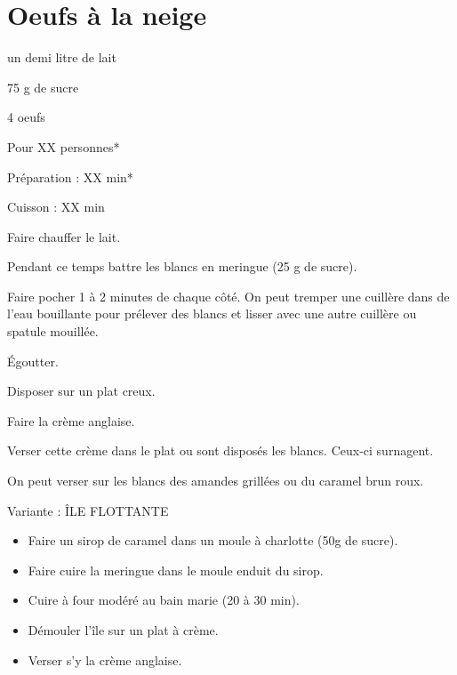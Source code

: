 \section{Oeufs à la neige}

\begin{ingredients}
\item un demi litre de lait
\item 75 g de sucre
\item 4 oeufs
\end{ingredients}
\begin{infos}
\item Pour XX personnes*		%
\item Préparation : XX min*		%
\item Cuisson : XX min			%
\end{infos}
\begin{etapes}
\item Faire chauffer le lait.
\item Pendant ce temps battre les blancs en meringue (25 g de sucre).
\item Faire pocher 1 à 2 minutes de chaque côté. On peut tremper une cuillère dans de l'eau bouillante pour prélever des blancs et lisser avec une autre cuillère ou spatule mouillée.
\item Égoutter.
\item Disposer sur un plat creux.
\item Faire la crème anglaise.
\item Verser cette crème dans le plat ou sont disposés les blancs. Ceux-ci surnagent.
\item On peut verser sur les blancs des amandes grillées ou du caramel brun roux.
\end{etapes}
\begin{conseils}
Variante : ÎLE FLOTTANTE
\begin{itemize}
\item Faire un sirop de caramel dans un moule à charlotte (50g de sucre).
\item Faire cuire la meringue dans le moule enduit du sirop.
\item Cuire à four modéré au bain marie (20 à 30 min).
\item Démouler l’île sur un plat à crème.
\item Verser s’y la crème anglaise.
\end{itemize}
\end{conseils}
